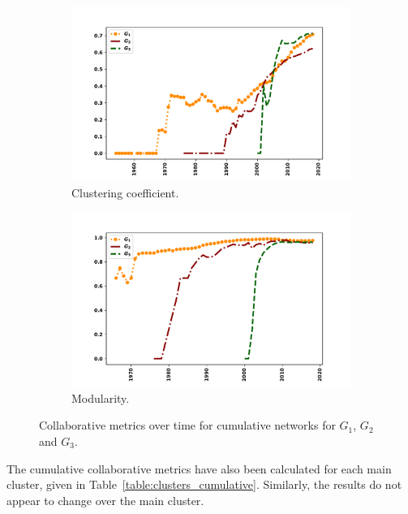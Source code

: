 \documentclass{article}
\theoremstyle{definition}
\begin{document}
\begin{figure}[!hbtp]
    \begin{subfigure}{.45\textwidth}\centering
        \includegraphics[width=1.1\textwidth]{./assets/images/clustering_coeff_over_time.pdf}
        \caption{Clustering coefficient.}\label{fig:clustering_coefficient}
     \end{subfigure}
     \begin{subfigure}{.45\textwidth}\centering
        \includegraphics[width=1.1\textwidth]{./assets/images/modularity_over_time.pdf}
        \caption{Modularity.}\label{fig:modularity}
     \end{subfigure}
    \caption{Collaborative metrics over time for cumulative networks for \(G_1\),
    \(G_2\) and \(G_3\).}\label{fig:cumulative_networks}
\end{figure}

The cumulative collaborative metrics have also been calculated for each main
cluster, given in Table~\ref{table:clusters_cumulative}. Similarly, the results
do not appear to change over the main cluster.
\end{document}
